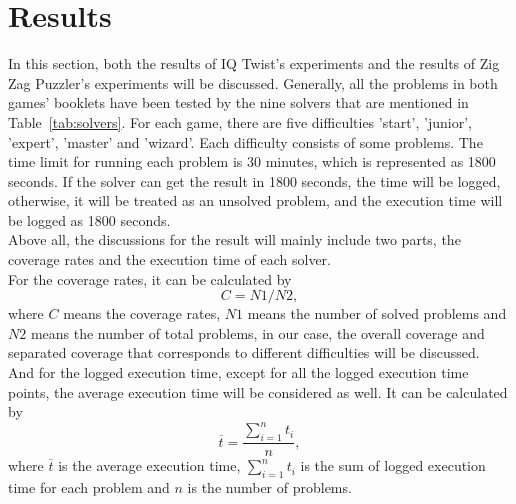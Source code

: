 \section{Results}
\label{sec:Result}
In this section, both the results of IQ Twist's experiments and the results of Zig Zag Puzzler's experiments will be discussed. Generally, all the problems in both games' booklets have been tested by the nine solvers that are mentioned in Table~\ref{tab:solvers}. For each game, there are five difficulties 'start', 'junior', 'expert', 'master' and 'wizard'. Each difficulty consists of some problems. The time limit for running each problem is 30 minutes, which is represented as 1800 seconds. If the solver can get the result in 1800 seconds, the time will be logged, otherwise, it will be treated as an unsolved problem, and the execution time will be logged as 1800 seconds. 
\\Above all, the discussions for the result will mainly include two parts, the coverage rates and the execution time of each solver. 
\\For the coverage rates, it can be calculated by 
\begin{equation}
\label{equation:coverage}
   C= N1/N2,
\end{equation}
where $C$ means the coverage rates, $N1$ means the number of solved problems and $N2$ means the number of total problems, in our case, the overall coverage and separated coverage that corresponds to different difficulties will be discussed.
\\And for the logged execution time, except for all the logged execution time points, the average execution time will be considered as well. It can be calculated by 
\begin{equation}
\label{equation:averagetime}
\overline{t}=\frac{\sum\limits_{i=1}^n t_{i}}{n},
\end{equation}
where $\overline{t}$ is the average execution time, $\sum\limits_{i=1}^n t_{i}$ is the sum of logged execution time for each problem and $n$ is the number of problems.
